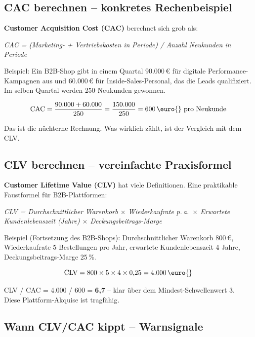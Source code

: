 \documentclass[11pt,a4paper,oneside]{article}
\newcommand{\fachbegriff}[1]{\textbf{#1}}
\begin{document}
\subsection{CAC berechnen -- konkretes Rechenbeispiel}

\fachbegriff{Customer Acquisition Cost (CAC)} berechnet sich grob als:

\begin{center}
\emph{CAC = (Marketing- + Vertriebskosten in Periode) / Anzahl Neukunden in Periode}
\end{center}

Beispiel: Ein B2B-Shop gibt in einem Quartal 90.000\,\euro{} für digitale Performance-Kampagnen aus und 60.000\,\euro{} für Inside-Sales-Personal, das die Leads qualifiziert. Im selben Quartal werden 250 Neukunden gewonnen.

\[
\text{CAC} = \frac{90{.}000 + 60{.}000}{250} = \frac{150{.}000}{250} = 600\,\text{\euro{} pro Neukunde}
\]

\noindent Das ist die nüchterne Rechnung. Was wirklich zählt, ist der Vergleich mit dem CLV.

\subsection{CLV berechnen -- vereinfachte Praxisformel}

\fachbegriff{Customer Lifetime Value (CLV)} hat viele Definitionen. Eine praktikable Faustformel für B2B-Plattformen:

\begin{center}
\emph{CLV = Durchschnittlicher Warenkorb $\times$ Wiederkaufrate p.\,a.\ $\times$ Erwartete Kundenlebenszeit (Jahre) $\times$ Deckungsbeitrags-Marge}
\end{center}

Beispiel (Fortsetzung des B2B-Shops): Durchschnittlicher Warenkorb 800\,\euro{}, Wiederkaufrate 5 Bestellungen pro Jahr, erwartete Kundenlebenszeit 4 Jahre, Deckungsbeitrags-Marge 25\,\%.

\[
\text{CLV} = 800 \times 5 \times 4 \times 0{,}25 = 4{.}000\,\text{\euro{}}
\]

\noindent CLV / CAC = 4.000 / 600 = \textbf{6{,}7} -- klar über dem Mindest-Schwellenwert 3. Diese Plattform-Akquise ist tragfähig.

\subsection{Wann CLV/CAC kippt -- Warnsignale}
\end{document}
